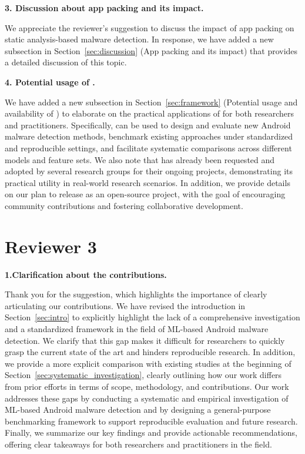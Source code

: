 \vspace{0.1cm}
\noindent \textbf{3. Discussion about app packing and its impact.}

We appreciate the reviewer's suggestion to discuss the impact of app packing on static analysis-based malware detection. In response, we have added a new subsection in Section~\ref{sec:discussion} (App packing and its impact) that provides a detailed discussion of this topic.

\vspace{0.1cm}
\noindent \textbf{4. Potential usage of \codename.}

We have added a new subsection in Section~\ref{sec:framework} (Potential usage and availability of \codename) to elaborate on the practical applications of \codename for both researchers and practitioners. Specifically, \codename can be used to design and evaluate new Android malware detection methods, benchmark existing approaches under standardized and reproducible settings, and facilitate systematic comparisons across different models and feature sets.
We also note that \codename has already been requested and adopted by several research groups for their ongoing projects, demonstrating its practical utility in real-world research scenarios. In addition, we provide details on our plan to release \codename as an open-source project, with the goal of encouraging community contributions and fostering collaborative development.


\section*{Reviewer 3}

\noindent \textbf{1.Clarification about the contributions.}

Thank you for the suggestion, which highlights the importance of clearly articulating our contributions. We have revised the introduction in Section~\ref{sec:intro} to explicitly highlight the lack of a comprehensive investigation and a standardized framework in the field of ML-based Android malware detection. We clarify that this gap makes it difficult for researchers to quickly grasp the current state of the art and hinders reproducible research.
In addition, we provide a more explicit comparison with existing studies at the beginning of Section~\ref{sec:systematic_investigation}, clearly outlining how our work differs from prior efforts in terms of scope, methodology, and contributions. Our work addresses these gaps by conducting a systematic and empirical investigation of ML-based Android malware detection and by designing a general-purpose benchmarking framework to support reproducible evaluation and future research.
Finally, we summarize our key findings and provide actionable recommendations, offering clear takeaways for both researchers and practitioners in the field.

